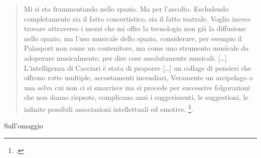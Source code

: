 \begin{quote}
Mi si sta frammentando nello spazio. Ma per l'ascolto. Escludendo completamente sia il fatto concertistico, sia il fatto teatrale. Voglio invece trovare attraverso i mezzi che mi offre la tecnologia non già la diffusione nello spazio, ma l'uso musicale dello spazio, considerare, per esempio il Palasport non come un contenitore, ma come uno strumento musicale da adoperare musicalmente, per dire cose assolutamente musicali. [\ldots] L'intelligenza di Cacciari è stata di proporre [\ldots] un collage di pensieri che offrono rotte multiple, accostamenti incendiari, Veramente un arcipelago o una selva cui non ci si smarrisce ma si procede per successive folgorazioni che non danno rispsote, complicano anzi i suggerimenti, le suggestioni, le infinite possibili associazioni intellettuali ed emotive. \footcite[vol. II p. 259-260, \emph{Intervista di Dino Villatico} 1981]{nono:scrcol}.  
\end{quote}

%
%
Sull'omaggio

